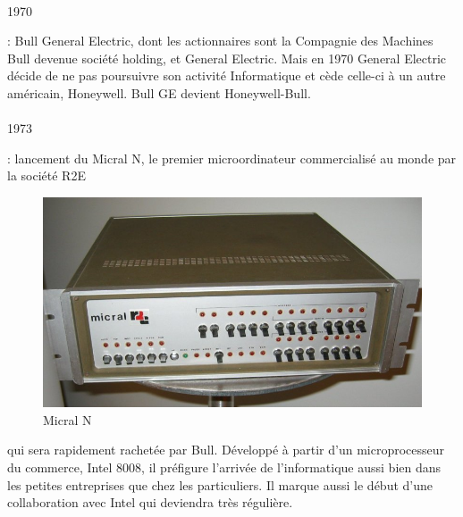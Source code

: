 \documentclass{article}
\begin{document}
		\paragraph{}
		\begin{bf}1970\end{bf}: Bull General Electric, dont les actionnaires sont la Compagnie des Machines Bull devenue 
		société holding, et General Electric. Mais en 1970 General Electric décide de ne pas poursuivre son activité 
		Informatique et cède celle-ci à un autre américain, Honeywell. Bull GE devient Honeywell-Bull.
		\newline{}
		\newline{}
		\paragraph{}
		\begin{bf}1973\end{bf}: lancement du Micral N, le premier microordinateur commercialisé au monde par la société R2E
		\begin{figure}
		\includegraphics[scale=0.1]{micral_n.jpg}
		\caption{Micral N}
		\end{figure} 
		qui sera rapidement rachetée par Bull. Développé à partir d’un microprocesseur du commerce, Intel 8008, il préfigure 
		l’arrivée de l’informatique aussi bien dans les petites entreprises que chez les particuliers. Il marque aussi le 
		début d’une collaboration avec Intel qui deviendra très régulière.
		\newline{}
		\newline{}
		\newline{}
\end{document}
